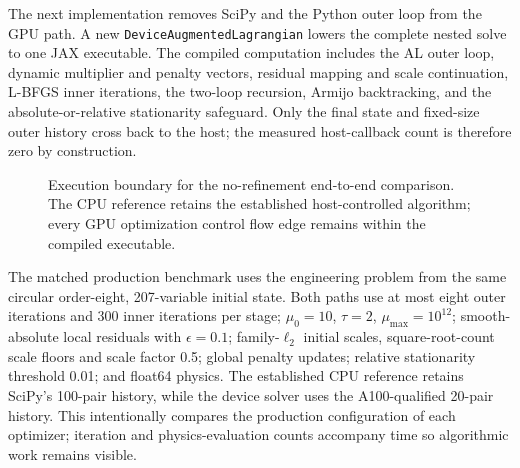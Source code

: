 \documentclass[11pt,a4paper]{article}
\newcommand{\code}[1]{\texttt{#1}}
\begin{document}
The next implementation removes SciPy and the Python outer loop from the GPU
path.  A new \code{DeviceAugmentedLagrangian} lowers the complete nested solve
to one JAX executable.  The compiled computation includes the AL outer loop,
dynamic multiplier and penalty vectors, residual mapping and scale
continuation, L-BFGS inner iterations, the two-loop recursion, Armijo
backtracking, and the absolute-or-relative stationarity safeguard.  Only the
final state and fixed-size outer history cross back to the host; the measured
host-callback count is therefore zero by construction.

\begin{figure}[htbp]
\centering
{}
\caption{Execution boundary for the no-refinement end-to-end comparison.  The
CPU reference retains the established host-controlled algorithm; every GPU
optimization control flow edge remains within the compiled executable.}
\label{fig:end-to-end-device-al-architecture}
\end{figure}

The matched production benchmark uses the engineering problem from the same
circular order-eight, 207-variable initial state.  Both paths use at most eight
outer iterations and 300 inner iterations per stage; $\mu_0=10$, $\tau=2$,
$\mu_{\max}=10^{12}$; smooth-absolute local residuals with $\epsilon=0.1$;
family-$\ell_2$ initial scales, square-root-count scale floors and scale factor
0.5; global penalty updates; relative stationarity threshold 0.01; and float64
physics.  The established CPU reference retains SciPy's 100-pair history, while
the device solver uses the A100-qualified 20-pair history.  This intentionally
compares the production configuration of each optimizer; iteration and
physics-evaluation counts accompany time so algorithmic work remains visible.
\end{document}
